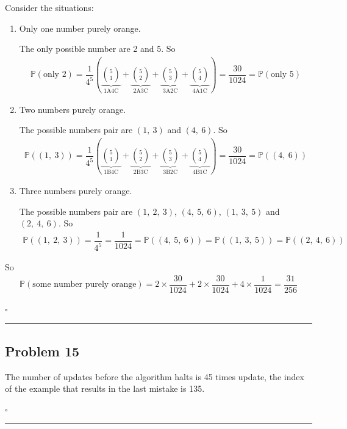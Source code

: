 \documentclass[12pt]{article}
\newcommand*{\QEDB}{\hfill\ensuremath{\square}}
\newcommand{\ParTh}[1]{\left(#1\right)}
\newcommand{\horrule}[1]{\rule{\linewidth}{#1}}
\begin{document}
Consider the situations:
\begin{enumerate}
\item Only one number purely orange.

The only possible number are 2 and 5. So
\begin{align}
\mathbb{P}\ParTh{\text{only 2}}=\dfrac{1}{4^5}\ParTh{\underbrace{\binom{5}{1}}_{\text{1A4C}}+\underbrace{\binom{5}{2}}_{\text{2A3C}}+\underbrace{\binom{5}{3}}_{\text{3A2C}}+\underbrace{\binom{5}{4}}_{\text{4A1C}}}=\dfrac{30}{1024}=\mathbb{P}\ParTh{\text{only 5}}
\end{align}
\item Two numbers purely orange.

The possible numbers pair are $\ParTh{1,~3}$ and $\ParTh{4,~6}$. So
\begin{align}
\mathbb{P}\ParTh{\ParTh{1,~3}}=\dfrac{1}{4^5}\ParTh{\underbrace{\binom{5}{1}}_{\text{1B4C}}+\underbrace{\binom{5}{2}}_{\text{2B3C}}+\underbrace{\binom{5}{3}}_{\text{3B2C}}+\underbrace{\binom{5}{4}}_{\text{4B1C}}}=\dfrac{30}{1024}=\mathbb{P}\ParTh{\ParTh{4,~6}}
\end{align}
\item Three numbers purely orange.

The possible numbers pair are $\ParTh{1,~2,~3}$, $\ParTh{4,~5,~6}$, $\ParTh{1,~3,~5}$ and $\ParTh{2,~4,~6}$. So
\begin{align}
\mathbb{P}\ParTh{\ParTh{1,~2,~3}}=\dfrac{1}{4^5}=\dfrac{1}{1024}=\mathbb{P}\ParTh{\ParTh{4,~5,~6}}=\mathbb{P}\ParTh{\ParTh{1,~3,~5}}=\mathbb{P}\ParTh{\ParTh{2,~4,~6}}
\end{align}
\end{enumerate}
So
\begin{align}
\mathbb{P}\ParTh{\text{some number purely orange}}=2\times\dfrac{30}{1024}+2\times\dfrac{30}{1024}+4\times\dfrac{1}{1024}=\dfrac{31}{256}
\end{align}

\QEDB

\horrule{0.5pt}

\subsection*{Problem 15}

The number of updates before the
algorithm halts is 45 times update, the index of the example that results in the last mistake is 135.

\QEDB

\horrule{0.5pt}
\end{document}
